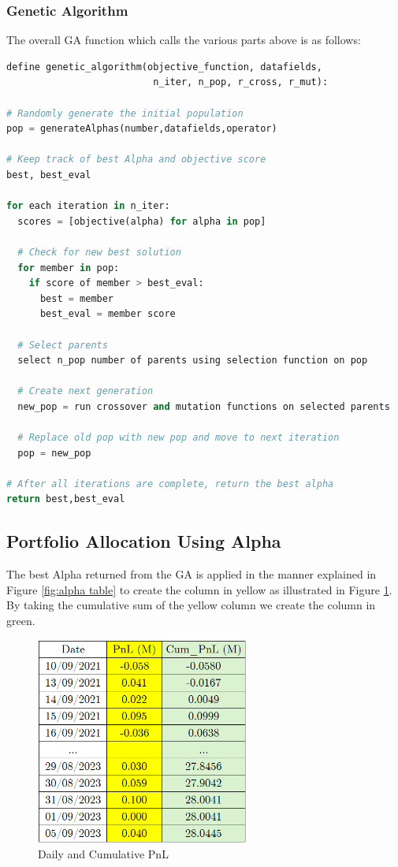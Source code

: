 \documentclass[a4paper,12pt]{report}
\numberwithin{equation}{section}
\theoremstyle{definition}
\begin{document}
\subsubsection{Genetic Algorithm}
The overall GA function which calls the various parts above is as follows:
\begin{lstlisting}[language=Python, caption=Genetic Algorithm Pseudocode, basicstyle=\footnotesize\ttfamily]
define genetic_algorithm(objective_function, datafields, 
                          n_iter, n_pop, r_cross, r_mut):

# Randomly generate the initial population
pop = generateAlphas(number,datafields,operator)

# Keep track of best Alpha and objective score
best, best_eval

for each iteration in n_iter:
  scores = [objective(alpha) for alpha in pop]

  # Check for new best solution
  for member in pop:
    if score of member > best_eval:
      best = member
      best_eval = member score

  # Select parents
  select n_pop number of parents using selection function on pop

  # Create next generation
  new_pop = run crossover and mutation functions on selected parents

  # Replace old pop with new pop and move to next iteration
  pop = new_pop

# After all iterations are complete, return the best alpha
return best,best_eval
\end{lstlisting}

\subsection{Portfolio Allocation Using Alpha}
The best Alpha returned from the GA is applied in the manner explained in Figure \ref{fig:alpha table} to create the column in yellow as illustrated in Figure \ref{fig:pnl_table}. By taking the cumulative sum of the yellow column we create the column in green.
\begin{figure}[H]
  \centerline{\includegraphics[width=7cm]{pnl}}
  \caption{Daily and Cumulative PnL}
  \label{fig:pnl_table}
\end{figure}
\end{document}
